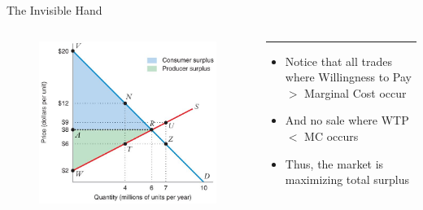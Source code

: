 \documentclass[11pt,t]{beamer}
\begin{document}
\begin{frame}{The Invisible Hand}

  \begin{columns}[T]
    \vspace{0pt}
    \begin{column}{.55\textwidth}
      \begin{figure}
        \includegraphics[width=\textwidth]{figures/fig10_1.jpg}
      \end{figure}

      \vspace*{50mm} %
    \end{column}
    
    \hfill
    
    \begin{column}{.45\textwidth}
      {\color{accent}\rule{\linewidth}{2pt}}

      \begin{itemize}
        \item Notice that all trades where Willingness to Pay $ > $ Marginal Cost occur
        \item And no sale where WTP $ < $ MC occurs
        \item Thus, the market is maximizing total surplus
      \end{itemize}
    \end{column}
  \end{columns}

\end{frame}
\end{document}
